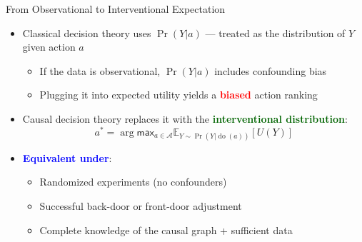 \documentclass[
  10pt,
  ignorenonframetext,
]{beamer}
\providecommand{\tightlist}{%
  \setlength{\itemsep}{0pt}\setlength{\parskip}{0pt}}
\newcommand{\EE}{\mathbb{E}}
\def\max{\textsf{max}}
\begin{document}
\begin{frame}{From Observational to Interventional Expectation}
\label{from-observational-to-interventional-expectation}
\begin{itemize}
\item
  Classical decision theory uses \(\Pr(Y | a)\) --- treated as the
  distribution of \(Y\) given action \(a\)

  \begin{itemize}
  \tightlist
  \item
    If the data is observational, \(\Pr(Y | a)\) includes confounding
    bias
  \item
    Plugging it into expected utility yields a
    \textbf{\textcolor{red}{biased}} action ranking
  \end{itemize}
\item
  Causal decision theory replaces it with the
  \textbf{\textcolor{darkgreen}{interventional distribution}}: \[
  a^* = \arg\max_{a \in \mathcal{A}} \EE_{Y \sim \Pr(Y | \operatorname{do}(a))}[U(Y)]
  \]
\item
  \textbf{\textcolor{blue}{Equivalent under}}:

  \begin{itemize}
  \tightlist
  \item
    Randomized experiments (no confounders)
  \item
    Successful back-door or front-door adjustment
  \item
    Complete knowledge of the causal graph + sufficient data
  \end{itemize}
\end{itemize}
\end{frame}
\end{document}
